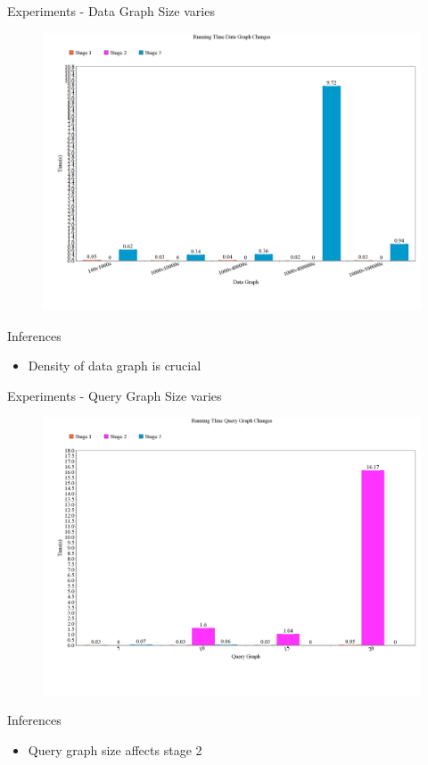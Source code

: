 \documentclass{beamer}
\begin{document}
\begin{frame}{Experiments - Data Graph Size varies}
\begin{figure}[h]
 \centering
\includegraphics[width=.5\textwidth]{Dchange.png}

 \label{fig:dchange}
\end{figure}
\begin{block}{Inferences}
    \begin{itemize}
    \item Density of data graph is crucial
    \end{itemize}
\end{block}
\end{frame}
\begin{frame}{Experiments - Query Graph Size varies}
\begin{figure}[h]
 \centering
\includegraphics[width=.5\textwidth]{Qchange.png}

 \label{fig:dchange}
\end{figure}
\begin{block}{Inferences}
    \begin{itemize}
    \item Query graph size affects stage 2
    \end{itemize}
\end{block}
\end{frame}
\end{document}
